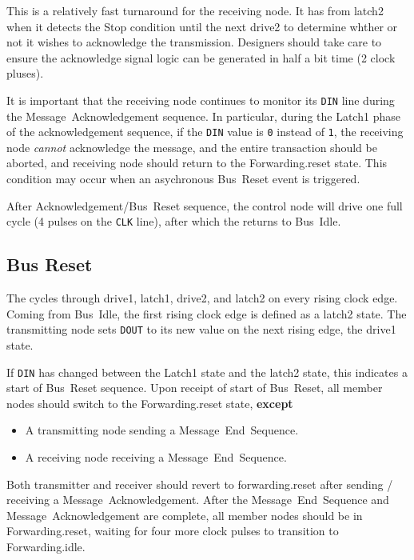 This is a relatively fast turnaround for the receiving node. It has from {\sc
latch2} when it detects the Stop condition until the next {\sc drive2} to
determine whther or not it wishes to acknowledge the transmission. Designers
should take care to ensure the acknowledge signal logic can be generated in
half a bit time (2 clock pluses).

It is important that the receiving node continues to monitor its {\tt DIN}
line during the Message~Acknowledgement sequence. In particular, during the
{\sc Latch1} phase of the acknowledgement sequence, if the {\tt DIN} value is
{\tt 0} instead of {\tt 1}, the receiving node {\em cannot} acknowledge the
message, and the entire transaction should be aborted, and receiving node
should return to the Forwarding.{\sc reset} state. This condition may occur
when an asychronous Bus~Reset event is triggered.

After Acknowledgement/Bus~Reset sequence, the control node will drive one
full cycle (4 pulses on the {\tt CLK} line), after which the \bus returns to
Bus~Idle.

\subsection{Bus Reset}
\label{sec:protocol-reset}
The \bus cycles through {\sc drive1}, {\sc latch1}, {\sc drive2}, and {\sc
latch2} on every rising clock edge.  Coming from Bus~Idle, the first rising
clock edge is defined as a {\sc latch2 state}.
The transmitting node sets {\tt DOUT} to
its new value on the next rising edge, the {\sc drive1} state.

If {\tt DIN} has changed between the {\sc Latch1} state and the {\sc latch2}
state, this indicates a start of Bus~Reset sequence. Upon receipt of start of
Bus~Reset, all member nodes should switch to the Forwarding.{\sc reset} state,
{\bf except}
\begin{itemize}
  \item A transmitting node sending a Message~End~Sequence.
  \item A receiving node receiving a Message~End~Sequence.
\end{itemize}
Both transmitter and receiver should revert to forwarding.{\sc reset}
after sending / receiving a Message~Acknowledgement. After the
Message~End~Sequence and Message~Acknowledgement are complete, all member
nodes should be in Forwarding.{\sc reset}, waiting for four more clock pulses
to transition to Forwarding.{\sc idle}.

